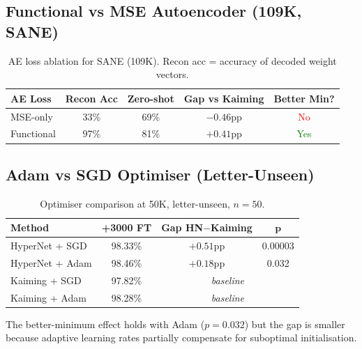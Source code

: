 \documentclass[11pt,a4paper]{article}
\begin{document}
\subsection{Functional vs MSE Autoencoder (109K, SANE)}

\begin{table}[H]
\centering
\caption{AE loss ablation for SANE (109K). Recon acc = accuracy of decoded weight vectors.}
\begin{tabular}{lcccc}
\toprule
\textbf{AE Loss} & \textbf{Recon Acc} & \textbf{Zero-shot} & \textbf{Gap vs Kaiming} & \textbf{Better Min?} \\
\midrule
MSE-only & 33\% & 69\% & $-0.46$pp & \textcolor{red}{No} \\
Functional & 97\% & 81\% & $+0.41$pp & \textcolor{green}{Yes} \\
\bottomrule
\end{tabular}
\end{table}

\subsection{Adam vs SGD Optimiser (Letter-Unseen)}

\begin{table}[H]
\centering
\caption{Optimiser comparison at 50K, letter-unseen, $n = 50$.}
\begin{tabular}{lccc}
\toprule
\textbf{Method} & \textbf{+3000 FT} & \textbf{Gap HN$-$Kaiming} & $\boldsymbol{p}$ \\
\midrule
HyperNet + SGD & 98.33\% & $+0.51$pp & 0.00003 \\
HyperNet + Adam & 98.46\% & $+0.18$pp & 0.032 \\
Kaiming + SGD & 97.82\% & \multicolumn{2}{c}{\textit{baseline}} \\
Kaiming + Adam & 98.28\% & \multicolumn{2}{c}{\textit{baseline}} \\
\bottomrule
\end{tabular}
\end{table}

The better-minimum effect holds with Adam ($p = 0.032$) but the gap is smaller because adaptive learning rates partially compensate for suboptimal initialisation.
\end{document}
